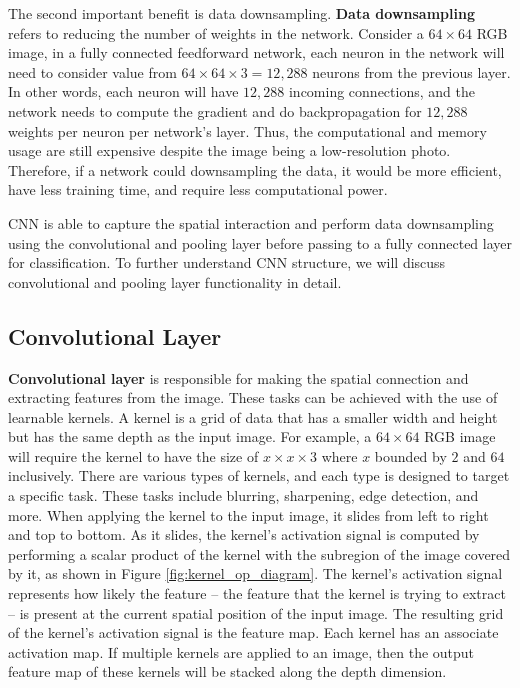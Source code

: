 The second important benefit is data downsampling. \textbf{Data downsampling} refers to reducing the number of weights in the network. Consider a $64 \times 64$ RGB image, in a fully connected feedforward network, each neuron in the network will need to consider value from $64 \times 64 \times 3 = 12,288$ neurons from the previous layer. In other words, each neuron will have $12,288$ incoming connections, and the network needs to compute the gradient and do backpropagation for $12,288$ weights per neuron per network's layer. Thus, the computational and memory usage are still expensive despite the image being a low-resolution photo. Therefore, if a network could downsampling the data, it would be more efficient, have less training time, and require less computational power.

CNN is able to capture the spatial interaction and perform data downsampling using the convolutional and pooling layer before passing to a fully connected layer for classification. To further understand CNN structure, we will discuss convolutional and pooling layer functionality in detail.

\subsection{Convolutional Layer}
\textbf{Convolutional layer} is responsible for making the spatial connection and extracting features from the image. These tasks can be achieved with the use of learnable kernels. A kernel is a grid of data that has a smaller width and height but has the same depth as the input image. For example, a $64 \times 64$ RGB image will require the kernel to have the size of $x \times x \times 3$ where $x$ bounded by $2$ and $64$ inclusively. There are various types of kernels, and each type is designed to target a specific task. These tasks include blurring, sharpening, edge detection, and more. When applying the kernel to the input image, it slides from left to right and top to bottom. As it slides, the kernel's activation signal is computed by performing a scalar product of the kernel with the subregion of the image covered by it, as shown in Figure \ref{fig:kernel_op_diagram}. The kernel's activation signal represents how likely the feature -- the feature that the kernel is trying to extract -- is present at the current spatial position of the input image. The resulting grid of the kernel's activation signal is the feature map. Each kernel has an associate activation map. If multiple kernels are applied to an image, then the output feature map of these kernels will be stacked along the depth dimension.

